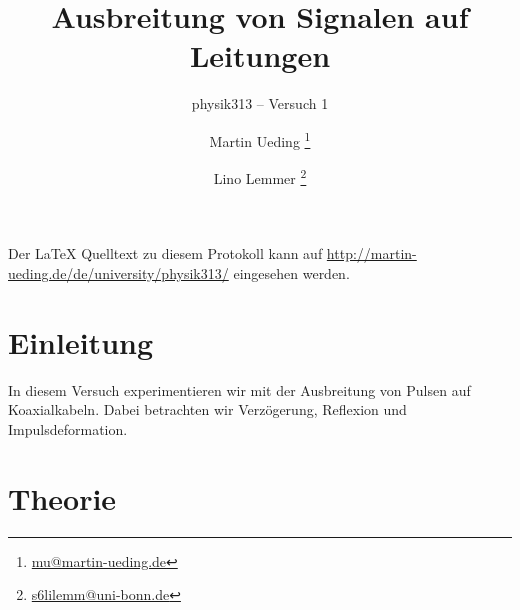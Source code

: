 


\usepackage{placeins}



\subject{Praktikumsprotokoll}
\title{Ausbreitung von Signalen auf Leitungen}
\subtitle{physik313 – Versuch 1}
\author{
	Martin Ueding \footnote{\href{mailto:mu@martin-ueding.de}{mu@martin-ueding.de}}
	\and
	Lino Lemmer \footnote{\href{mailto:s6lilemm@uni-bonn.de}{s6lilemm@uni-bonn.de}}
}
\publishers{Gruppe 3 -- A -- Brezina}

\setcounter{tocdepth}{2}



\maketitle

Der \LaTeX{} Quelltext zu diesem Protokoll kann auf \url{http://martin-ueding.de/de/university/physik313/} eingesehen werden.

\tableofcontents
\newpage


\section{Einleitung}

In diesem Versuch experimentieren wir mit der Ausbreitung von Pulsen auf
Koaxialkabeln. Dabei betrachten wir Verzögerung, Reflexion und
Impulsdeformation.


\newcommand\Uh{U_\text h}
\newcommand\Ur{U_\text r}

\section{Theorie}

